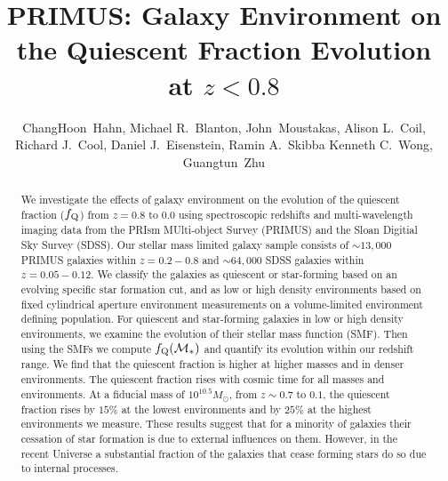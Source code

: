 \documentclass{emulateapj}
\begin{document}
\title{PRIMUS: Galaxy Environment on the Quiescent Fraction Evolution at $z < 0.8$}
\author{
ChangHoon~Hahn, 
Michael R.~Blanton, 
John~Moustakas,
Alison L.~Coil, 
Richard J.~Cool, 
Daniel J.~Eisenstein,
Ramin A.~Skibba
Kenneth C.~Wong, 
Guangtun~Zhu
}
\begin{abstract}
We investigate the effects of galaxy environment on the evolution of
the quiescent fraction ($f_{\rm{Q}}$) from $z =0.8 $ to $ 0.0$ using
spectroscopic redshifts and multi-wavelength imaging data from the
PRIsm MUlti-object Survey (PRIMUS) and the Sloan Digitial Sky Survey
(SDSS). Our stellar mass limited galaxy sample consists of $\sim
13,000$ PRIMUS galaxies within $z = 0.2-0.8$ and $\sim 64,000$ SDSS
galaxies within $z = 0.05-0.12$. We classify the galaxies as quiescent
or star-forming based on an evolving specific star formation cut, and
as low or high density environments based on fixed cylindrical
aperture environment measurements on a volume-limited environment
defining population. For quiescent and
star-forming galaxies in low or high density environments, we examine
the evolution of their stellar mass function (SMF). Then using the
SMFs we compute $f_{\rm{Q}}(\mathcal{M}_{*})$ and quantify its
evolution within our redshift range. We find that the quiescent
fraction is higher at higher masses and in denser environments. The
quiescent fraction rises with cosmic time for all masses and
environments. At a fiducial mass of $10^{10.5}M_\odot$, from $z\sim
0.7$ to $0.1$, the quiescent fraction rises by $15\%$ at the
lowest environments and by $25\%$ at the highest environments we measure.
These results suggest that for a minority of galaxies their cessation
of star formation is due to external influences on
them. However, in the recent Universe a substantial fraction of the
galaxies that cease forming stars do so due to internal processes.
\end{abstract}
\end{document}
